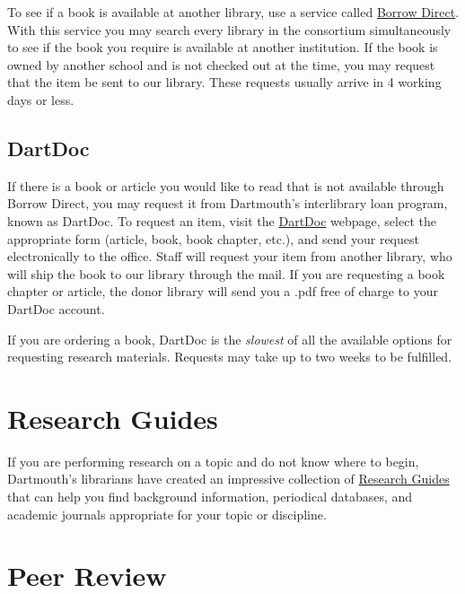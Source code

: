 To see if a book is available at another library, use a  service called
\href{http://www.dartmouth.edu/~library/res-share/borrowdirect/}{Borrow Direct}.
With this  service you may search every library in the consortium simultaneously
to see if the  book you require is available at another institution. If the book
is  owned by another school and is not checked out at the time, you may request
that the item be sent to our library. These requests usually arrive in 4 working
days or less.

\hypertarget{peer-review}{}

\subsection{DartDoc} If there is a book or article you would like to read that
is not available through Borrow Direct, you may request it from Dartmouth's
interlibrary loan program, known as DartDoc. To  request an item, visit the
\href{https://dartmouth.illiad.oclc.org/illiad/berry/logon.html}{DartDoc}
webpage, select the appropriate form (article, book, book chapter, etc.), and
send your request electronically to the office. Staff will
request your item from another library, who will ship the book to our library
through the mail. If you are requesting a book chapter or article, the donor
library will send you a .pdf free of charge to your DartDoc account.

\begin{center}
\begin{tcolorbox}[colframe=oyster, coltitle=black, sharp corners, title=\ding{52} Note]
If you are ordering a book, DartDoc is the
\emph{slowest} of all the  available options for requesting research materials.
Requests may take up to  two weeks to be fulfilled.
\end{tcolorbox}
\end{center}

\section{Research Guides}


If you are performing research on a topic and do not know where to begin,
Dartmouth's librarians have created an impressive collection of
\href{http://researchguides.dartmouth.edu}{Research Guides}  that can help you
find background information, periodical databases, and  academic journals
appropriate for your topic or discipline.


\section{Peer Review}

